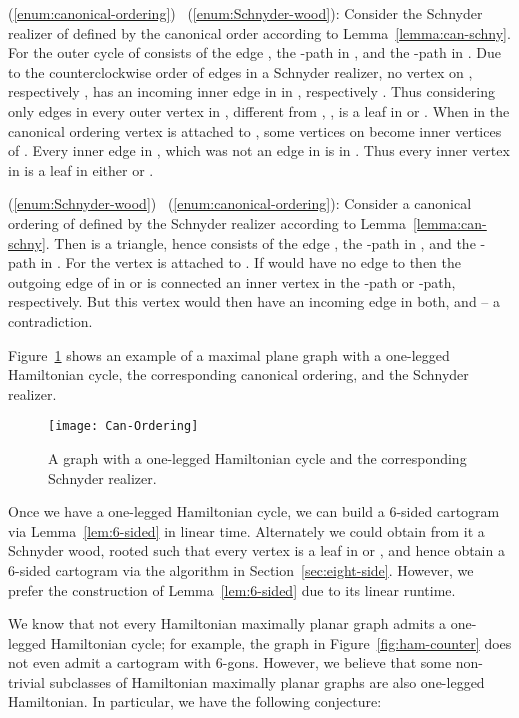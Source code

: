 \documentclass[11pt]{article}
\newenvironment{proof}{{\bf Proof:} }{\hspace*{\fill}\vspace{2mm}}
\begin{document}
\begin{proof}
 (\ref{enum:canonical-ordering})
~(\ref{enum:Schnyder-wood}): Consider the Schnyder
realizer  of  defined
by the canonical order  according to
Lemma~\ref{lemma:can-schny}. For  the outer cycle
 of  consists of the edge , the
-path  in , and the -path  in
. Due to the counterclockwise order of edges in a
Schnyder realizer, no vertex on , respectively , has an
incoming inner edge in  in , respectively
. Thus considering only edges in  every
outer vertex in , different from , , is a leaf
in  or . When in the canonical ordering
vertex  is attached to , some vertices on 
become inner vertices of . Every inner edge in
, which was not an edge in  is in
. Thus every inner vertex in  is a leaf in
either  or .

 (\ref{enum:Schnyder-wood})
~(\ref{enum:canonical-ordering}): Consider a
canonical ordering  of  defined by the Schnyder
realizer  according to
Lemma~\ref{lemma:can-schny}. Then  is a triangle,
hence  consists of the edge , the -path 
in , and the -path  in
. For  the vertex  is attached to
. If  would have no edge to  then the
outgoing edge of  in  or  is
connected an inner vertex in the -path or -path,
respectively. But this vertex would then have an incoming edge in
both,  and  -- a contradiction.
\end{proof}

Figure~\ref{fig:Can-Ordering} shows an example of a maximal plane
graph with a one-legged Hamiltonian cycle, the corresponding canonical
ordering, and the Schnyder realizer.

\begin{figure}[htbp]
\centering
 \texttt{[image: Can-Ordering]}
 \caption{\small\sf A
  graph with a one-legged Hamiltonian cycle and
 the corresponding Schnyder realizer.}
 \label{fig:Can-Ordering}
\end{figure}


Once we have a one-legged Hamiltonian cycle, we can build a
6-sided cartogram via Lemma~\ref{lem:6-sided} in linear
time. Alternately we could obtain from it a Schnyder wood, rooted such
that every vertex is a leaf in  or , and
hence obtain a 6-sided cartogram via the algorithm in
Section~\ref{sec:eight-side}. However, we prefer the construction of Lemma~\ref{lem:6-sided} due to
its linear runtime.

We know that not every Hamiltonian maximally planar graph admits a
one-legged Hamiltonian cycle; for example, the graph in
Figure~\ref{fig:ham-counter} does not even admit a cartogram with
6-gons. However, we believe that some non-trivial subclasses of
Hamiltonian maximally planar graphs are also one-legged Hamiltonian. In particular, we have the following conjecture:
\end{document}
